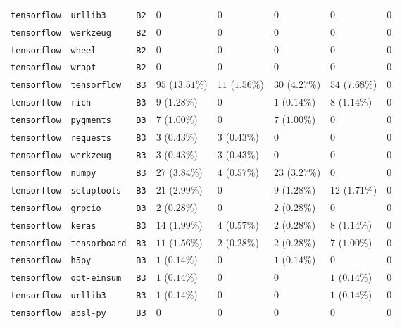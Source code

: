 \begin{table}
\begin{tabular}{llllllll}
\texttt{tensorflow} & \texttt{urllib3} & \texttt{B2} & $0$ & $0$ & $0$ & $0$ & $0$ \\
\texttt{tensorflow} & \texttt{werkzeug} & \texttt{B2} & $0$ & $0$ & $0$ & $0$ & $0$ \\
\texttt{tensorflow} & \texttt{wheel} & \texttt{B2} & $0$ & $0$ & $0$ & $0$ & $0$ \\
\texttt{tensorflow} & \texttt{wrapt} & \texttt{B2} & $0$ & $0$ & $0$ & $0$ & $0$ \\
\texttt{tensorflow} & \texttt{tensorflow} & \texttt{B3} & $95$ ($13.51\%$) & $11$ ($1.56\%$) & $30$ ($4.27\%$) & $54$ ($7.68\%$) & $0$ \\
\texttt{tensorflow} & \texttt{rich} & \texttt{B3} & $9$ ($1.28\%$) & $0$ & $1$ ($0.14\%$) & $8$ ($1.14\%$) & $0$ \\
\texttt{tensorflow} & \texttt{pygments} & \texttt{B3} & $7$ ($1.00\%$) & $0$ & $7$ ($1.00\%$) & $0$ & $0$ \\
\texttt{tensorflow} & \texttt{requests} & \texttt{B3} & $3$ ($0.43\%$) & $3$ ($0.43\%$) & $0$ & $0$ & $0$ \\
\texttt{tensorflow} & \texttt{werkzeug} & \texttt{B3} & $3$ ($0.43\%$) & $3$ ($0.43\%$) & $0$ & $0$ & $0$ \\
\texttt{tensorflow} & \texttt{numpy} & \texttt{B3} & $27$ ($3.84\%$) & $4$ ($0.57\%$) & $23$ ($3.27\%$) & $0$ & $0$ \\
\texttt{tensorflow} & \texttt{setuptools} & \texttt{B3} & $21$ ($2.99\%$) & $0$ & $9$ ($1.28\%$) & $12$ ($1.71\%$) & $0$ \\
\texttt{tensorflow} & \texttt{grpcio} & \texttt{B3} & $2$ ($0.28\%$) & $0$ & $2$ ($0.28\%$) & $0$ & $0$ \\
\texttt{tensorflow} & \texttt{keras} & \texttt{B3} & $14$ ($1.99\%$) & $4$ ($0.57\%$) & $2$ ($0.28\%$) & $8$ ($1.14\%$) & $0$ \\
\texttt{tensorflow} & \texttt{tensorboard} & \texttt{B3} & $11$ ($1.56\%$) & $2$ ($0.28\%$) & $2$ ($0.28\%$) & $7$ ($1.00\%$) & $0$ \\
\texttt{tensorflow} & \texttt{h5py} & \texttt{B3} & $1$ ($0.14\%$) & $0$ & $1$ ($0.14\%$) & $0$ & $0$ \\
\texttt{tensorflow} & \texttt{opt-einsum} & \texttt{B3} & $1$ ($0.14\%$) & $0$ & $0$ & $1$ ($0.14\%$) & $0$ \\
\texttt{tensorflow} & \texttt{urllib3} & \texttt{B3} & $1$ ($0.14\%$) & $0$ & $0$ & $1$ ($0.14\%$) & $0$ \\
\texttt{tensorflow} & \texttt{absl-py} & \texttt{B3} & $0$ & $0$ & $0$ & $0$ & $0$ \\

\end{tabular}
\end{table}

